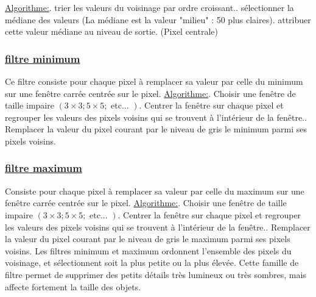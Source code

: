 \documentclass[12pt,a4paper]{report}
\numberwithin{equation}{subsection}
\numberwithin{equation}{section}
\begin{document}
\underline {Algorithme:}. trier les valeurs du voisinage par ordre croissant.. sélectionner la médiane des valeurs
(La médiane est la valeur "milieu" : 50 %
plus claires). attribuer cette valeur médiane au niveau de sortie. (Pixel centrale)\newline

\subsubsection{ \underline {filtre minimum}}
Ce filtre consiste pour chaque pixel à remplacer sa valeur par celle du minimum sur une fenêtre carrée centrée sur le pixel.\newline
\underline {Algorithme:}. Choisir une fenêtre de taille impaire $(3 \times 3 ; 5 \times 5 ; \text { etc... })$. Centrer la fenêtre sur chaque pixel et regrouper les valeurs des pixels voisins qui se trouvent à l'intérieur de la fenêtre.. Remplacer la valeur du pixel courant par le niveau de gris le minimum parmi ses pixels voisins.\newline
\subsubsection{\underline {filtre maximum}}
Consiste pour chaque pixel à remplacer sa valeur par celle du maximum sur une fenêtre carrée centrée sur le pixel.\newline
\underline {Algorithme:}. Choisir une fenêtre de taille impaire $(3 \times 3 ; 5 \times 5 ; \text { etc... })$. Centrer la fenêtre sur chaque pixel et regrouper les valeurs des pixels voisins qui se trouvent à l'intérieur de la fenêtre.. Remplacer la valeur du pixel courant par le niveau de gris le maximum parmi ses pixels voisins.\newline
\newline
Les filtres minimum et maximum ordonnent l'ensemble des pixels du voisinage, et sélectionnent soit la plus petite ou la plus élevée. Cette famille de filtre permet de supprimer des petits détails très lumineux ou très sombres, mais affecte fortement la taille des objets.
\end{document}
